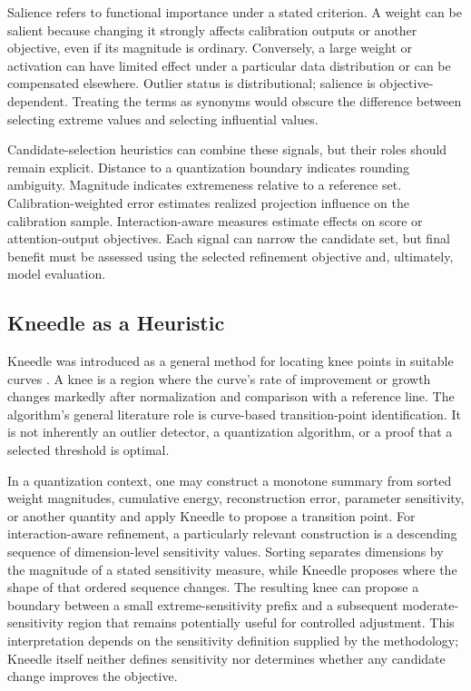 Salience refers to functional importance under a stated criterion. A weight can be salient because changing it strongly affects calibration outputs or another objective, even if its magnitude is ordinary. Conversely, a large weight or activation can have limited effect under a particular data distribution or can be compensated elsewhere. Outlier status is distributional; salience is objective-dependent. Treating the terms as synonyms would obscure the difference between selecting extreme values and selecting influential values.

Candidate-selection heuristics can combine these signals, but their roles should remain explicit. Distance to a quantization boundary indicates rounding ambiguity. Magnitude indicates extremeness relative to a reference set. Calibration-weighted error estimates realized projection influence on the calibration sample. Interaction-aware measures estimate effects on score or attention-output objectives. Each signal can narrow the candidate set, but final benefit must be assessed using the selected refinement objective and, ultimately, model evaluation.

\subsection{Kneedle as a Heuristic}

Kneedle was introduced as a general method for locating knee points in suitable curves \cite{satopaa2011kneedle}. A knee is a region where the curve's rate of improvement or growth changes markedly after normalization and comparison with a reference line. The algorithm's general literature role is curve-based transition-point identification. It is not inherently an outlier detector, a quantization algorithm, or a proof that a selected threshold is optimal.

In a quantization context, one may construct a monotone summary from sorted weight magnitudes, cumulative energy, reconstruction error, parameter sensitivity, or another quantity and apply Kneedle to propose a transition point. For interaction-aware refinement, a particularly relevant construction is a descending sequence of dimension-level sensitivity values. Sorting separates dimensions by the magnitude of a stated sensitivity measure, while Kneedle proposes where the shape of that ordered sequence changes. The resulting knee can propose a boundary between a small extreme-sensitivity prefix and a subsequent moderate-sensitivity region that remains potentially useful for controlled adjustment. This interpretation depends on the sensitivity definition supplied by the methodology; Kneedle itself neither defines sensitivity nor determines whether any candidate change improves the objective.

